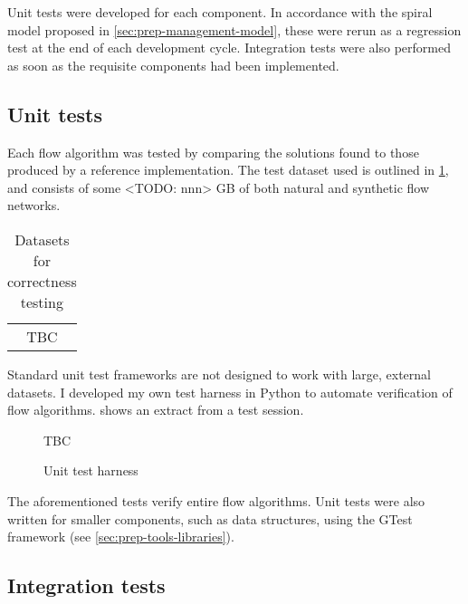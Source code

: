 
Unit tests were developed for each component. In accordance with the spiral model proposed in \cref{sec:prep-management-model}, these were rerun as a regression test at the end of each development cycle. Integration tests were also performed as soon as the requisite components had been implemented.

\subsection{Unit tests} \label{sec:eval-testing-unit}

Each flow algorithm was tested by comparing the solutions found to those produced by a reference implementation. The test dataset used is outlined in \cref{table:correctness-test-dataset}, and consists of some <TODO: nnn> GB of both natural and synthetic flow networks.

\begin{table}
    \begin{tabular}{c}
        TBC
    \end{tabular}
    \caption{Datasets for correctness testing}
    \label{table:correctness-test-dataset}
\end{table}

Standard unit test frameworks are not designed to work with large, external datasets. I developed my own test harness in Python to automate verification of flow algorithms.  shows an extract from a test session.

\begin{figure} 
    TBC
    \caption{Unit test harness}
    \label{fig:unit-test-harness}
\end{figure}

The aforementioned tests verify entire flow algorithms. Unit tests were also written for smaller components, such as data structures, using the GTest framework (see \cref{sec:prep-tools-libraries}).

\subsection{Integration tests} \label{sec:eval-test-integration}

